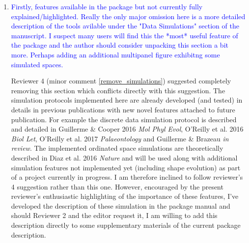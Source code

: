 \documentclass[12pt,letterpaper]{article}
\begin{document}
\begin{enumerate}
\item{\textcolor{blue}{Firstly, features available in the package but not currently fully explained/highlighted.
Really the only major omission here is a more detailed description of the tools avilable under the "Data Simulations" section of the manuscript.
I suspect many users will find this the *most* useful feature of the package and the author should consider unpacking this section a bit more.
Perhaps adding an additional multipanel figure exhibitng some simulated spaces.}}

Reviewer 4 (minor comment \ref{remove_simulations}) suggested completely removing this section which conflicts directly with this suggestion.
The simulation protocols implemented here are already developed (and tested) in details in previous publications with new novel features attached to future publication.
For example the discrete data simulation protocol is described and detailed in Guillerme \& Cooper 2016 \textit{Mol Phyl Evol}, O’Reilly et al. 2016 \textit{Biol Let}, O'Reilly et al. 2017 \textit{Palaeontology} and Guillerme \& Brazeau \textit{in review}.
The implemented ordinated space simulations are theoretically described in Diaz et al. 2016 \textit{Nature} and will be used along with additional simulation features not implemented yet (including shape evolution) as part of a project currently in progress.
I am therefore inclined to follow reviewer's 4 suggestion rather than this one.
However, encouraged by the present reviewer's enthusiastic highlighting of the importance of these features, I've developed the description of these simulation in the package manual and should Reviewer 2 and the editor request it, I am willing to add this description directly to some supplementary materials of the current package description.




\end{enumerate}
\end{document}
